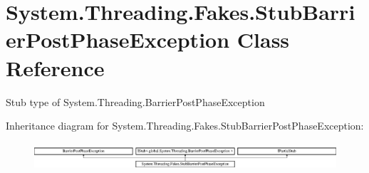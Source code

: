\hypertarget{class_system_1_1_threading_1_1_fakes_1_1_stub_barrier_post_phase_exception}{\section{System.\-Threading.\-Fakes.\-Stub\-Barrier\-Post\-Phase\-Exception Class Reference}
\label{class_system_1_1_threading_1_1_fakes_1_1_stub_barrier_post_phase_exception}
}


Stub type of System.\-Threading.\-Barrier\-Post\-Phase\-Exception 


Inheritance diagram for System.\-Threading.\-Fakes.\-Stub\-Barrier\-Post\-Phase\-Exception\-:\begin{figure}[H]
\begin{center}
\leavevmode
\includegraphics[height=1.011743cm]{class_system_1_1_threading_1_1_fakes_1_1_stub_barrier_post_phase_exception}
\end{center}
\end{figure}
